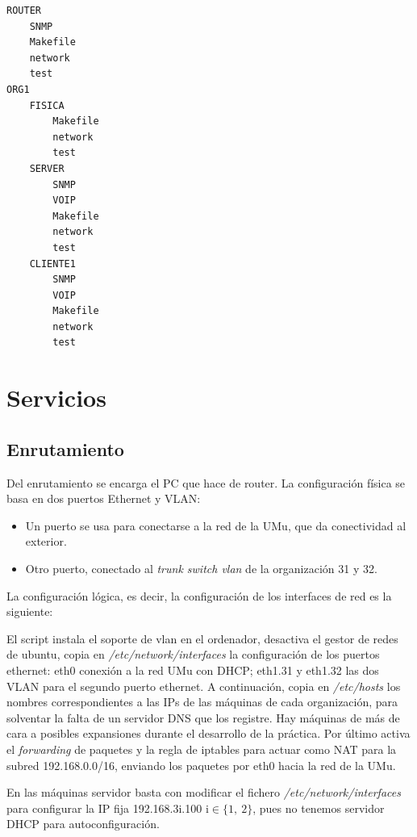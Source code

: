 \documentclass[]{article}
\begin{document}
\begin{Verbatim}
ROUTER
	SNMP
	Makefile
	network
	test
ORG1
	FISICA
		Makefile
		network
		test
	SERVER
		SNMP
		VOIP
		Makefile
		network
		test
	CLIENTE1
		SNMP
		VOIP
		Makefile
		network
		test

\end{Verbatim}





\section{Servicios}

\subsection{Enrutamiento}

Del enrutamiento se encarga el PC que hace de router. La configuración física se basa en dos puertos Ethernet y VLAN:

\begin{itemize}
	\item Un puerto se usa para conectarse a la red de la UMu, que da conectividad al exterior.
	\item Otro puerto, conectado al \textit{trunk switch vlan} de la organización 31 y 32.
\end{itemize}

La configuración lógica, es decir, la configuración de los interfaces de red es la siguiente:



El script instala el soporte de vlan en el ordenador, desactiva el gestor de redes de ubuntu, copia en \textit{/etc/network/interfaces} la configuración de los puertos ethernet: eth0 conexión a la red UMu con DHCP; eth1.31 y eth1.32 las dos VLAN para el segundo puerto ethernet. A continuación, copia en \textit{/etc/hosts} los nombres correspondientes a las IPs de las máquinas de cada organización, para solventar la falta de un servidor DNS que los registre. Hay máquinas de más de cara a posibles expansiones durante el desarrollo de la práctica. Por último activa el \textit{forwarding} de paquetes y la regla de iptables para actuar como NAT para la subred 192.168.0.0/16, enviando los paquetes por eth0 hacia la red de la UMu.

En las máquinas servidor basta con modificar el fichero \textit{/etc/network/interfaces} para configurar la IP fija 192.168.3i.100 i$ \in \{1,\ 2\} $, pues no tenemos servidor DHCP para autoconfiguración.
\end{document}
